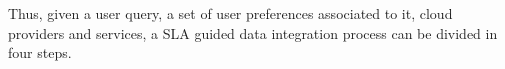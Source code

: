 %

%

Thus, given a user query, a set of user preferences associated to it, cloud
providers and services, a SLA guided data integration process can be divided in four steps.
\bigskip

